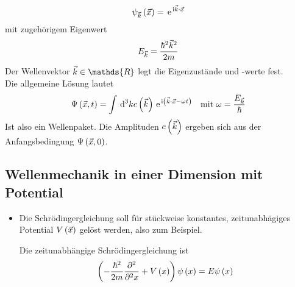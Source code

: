 \begin{itemize}
	\begin{equation}
		\psi_{\vK}\of{\vX} = \e{\mI\vK\cdot\vX}
	\end{equation}
	mit zugehörigem Eigenwert
	\begin{equation}
		E_{\vK} = \frac{\hbar^2\vK^2}{2m}
	\end{equation}
	Der Wellenvektor $\vK \in \mathds{R}$ legt die Eigenzustände und -werte fest.\\
	Die allgemeine Lösung lautet
	\begin{equation}
		\Psi\of{\vX,t} = \int\dn{k}{3} c\of{\vK} \e{\mI\norBra{\vK\cdot\vX - \omega t}} \quad \text{mit } \omega = \frac{E_{\vK}}{\hbar}
	\end{equation}
	Ist also ein Wellenpaket. Die Amplituden $c\of{\vK}$ ergeben sich aus der Anfangsbedingung $\Psi\of{\vX,0}$.
\end{itemize}

\subsection{Wellenmechanik in einer Dimension mit Potential}

\begin{itemize}
	\item Die Schrödingergleichung soll für stückweise konstantes, zeitunabhägiges Potential $V\of{\vX}$ gelöst werden, also zum Beispiel.
	\begin{figure}[H]
		\centering
		
	\end{figure}
	\begin{figure}[H]
		\centering
		
	\end{figure}
	Die zeitunabhängige Schrödingergleichung ist
	\begin{equation}
		\norBra{-\frac{\hbar^2}{2m}\nppv{}{x}{2}+V\of{x}} \psi\of{x} = E\psi\of{x}
	\end{equation}
	\begin{figure}[H]
		\centering
		
	\end{figure}
\end{itemize}
